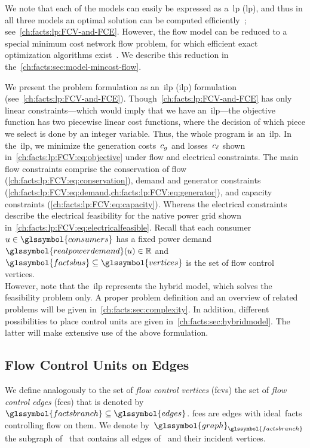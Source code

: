 We note that each of the models can easily be expressed as a~\acrlong{lp}
(\gls{lp}), and thus in all three models an optimal solution can be
computed efficiently~\parencite{Baz04}; see~\cref{ch:facts:lp:FCV-and-FCE}.
However, the flow model can be reduced to a special minimum cost network flow
problem, for which efficient exact optimization algorithms
exist~\parencite{Goldberg19971}. We describe this reduction in
the~\cref{ch:facts:sec:model-mincost-flow}.

We present the problem formulation as an~\acrlong{ilp} (\gls{ilp}) formulation
(see~\cref{ch:facts:lp:FCV-and-FCE}). Though~\cref{ch:facts:lp:FCV-and-FCE} has
only linear constraints---which would imply that we have an~\gls{ilp}---the
objective function has two piecewise linear cost functions, where the decision
of which piece we select is done by an integer variable. Thus, the whole program
is an~\gls{ilp}. In the~\gls{ilp}, we minimize the generation costs~$c_g$
and losses~$c_\ell$ shown in~\cref{ch:facts:lp:FCV:eq:objective} under flow
and electrical constraints. The main flow constraints comprise the conservation
of flow (\cref{ch:facts:lp:FCV:eq:conservation}), demand and generator
constraints (\cref{ch:facts:lp:FCV:eq:demand,ch:facts:lp:FCV:eq:generator}), and
capacity constraints (\cref{ch:facts:lp:FCV:eq:capacity}). Whereas the
electrical constraints describe the electrical feasibility for the native power
grid shown in~\cref{ch:facts:lp:FCV:eq:electricalfeasible}. Recall that each
consumer~$\vertexa\in\glssymbol{consumers}$ has a fixed power
demand~$\glssymbol{realpowerdemand}(\vertexa)\in\reals$
and~$\glssymbol{factsbus}\subseteq\glssymbol{vertices}$ is the set of flow
control vertices.
% 
\begin{subequations}
    
    \label{ch:facts:lp:FCV-and-FCE}
\end{subequations}
% 
However, note that the~\gls{ilp} represents the hybrid model, which solves the
feasibility problem only. A proper problem definition and an overview of related
problems will be given in~\cref{ch:facts:sec:complexity}. In addition, different
possibilities to place control units are given
in~\cref{ch:facts:sec:hybridmodel}. The latter will make extensive use of the
above formulation.
% 
\subsection{Flow Control Units on Edges}%
\label{ch:facts:sec:flow-control-units-on-edges}%
% 
We define analogously to the set of \emph{flow control vertices} (\gls{fcv}s)
the set of \emph{flow control edges} (\gls{fce}s) that is denoted
by~$\glssymbol{factsbranch}\subseteq\glssymbol{edges}$. \gls{fce}s are edges
with ideal~\gls{facts} controlling flow on them. We denote
by~$\glssymbol{graph}_{\glssymbol{factsbranch}}$ the subgraph
of~ that contains all edges of~ and
their incident vertices.


